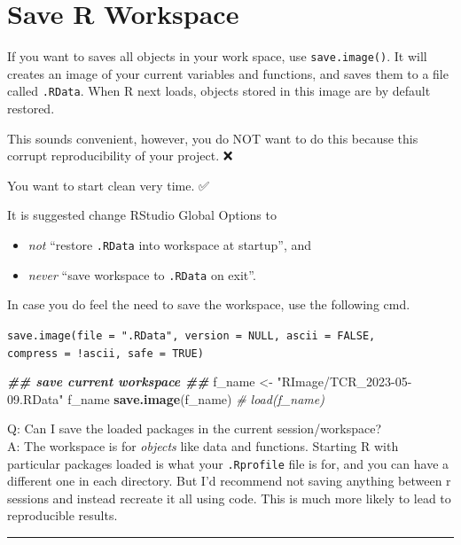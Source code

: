 \documentclass[
]{book}
\newenvironment{Shaded}{\begin{snugshade}}{\end{snugshade}}
\newcommand{\CommentTok}[1]{\textcolor[rgb]{0.56,0.35,0.01}{\textit{#1}}}
\newcommand{\DocumentationTok}[1]{\textcolor[rgb]{0.56,0.35,0.01}{\textbf{\textit{#1}}}}
\newcommand{\FunctionTok}[1]{\textcolor[rgb]{0.13,0.29,0.53}{\textbf{#1}}}
\newcommand{\NormalTok}[1]{#1}
\newcommand{\OtherTok}[1]{\textcolor[rgb]{0.56,0.35,0.01}{#1}}
\newcommand{\StringTok}[1]{\textcolor[rgb]{0.31,0.60,0.02}{#1}}
\providecommand{\tightlist}{%
  \setlength{\itemsep}{0pt}\setlength{\parskip}{0pt}}
\begin{document}
\section{Save R Workspace}\label{save-r-workspace}

If you want to saves {all objects} in your work space, use \texttt{save.image()}. It will creates an image of your current variables and functions, and saves them to a file called \texttt{.RData}. When R next loads, objects stored in this image are by default restored.

This sounds convenient, however, you do NOT want to do this because this corrupt reproducibility of your project. ❌

You want to start clean very time. ✅

It is suggested change RStudio Global Options to

\begin{itemize}
\tightlist
\item
  \emph{not} ``restore \texttt{.RData} into workspace at startup'', and
\item
  \emph{never} ``save workspace to \texttt{.RData} on exit''.
\end{itemize}

In case you do feel the need to save the workspace, use the following cmd.

\texttt{save.image(file\ =\ ".RData",\ version\ =\ NULL,\ ascii\ =\ FALSE,\ \ \ \ \ \ \ \ \ \ \ \ compress\ =\ !ascii,\ safe\ =\ TRUE)}

\begin{Shaded}
\begin{Highlighting}[]
\DocumentationTok{\#\# save current workspace \#\#}
\NormalTok{f\_name }\OtherTok{\textless{}{-}} \StringTok{"RImage/TCR\_2023{-}05{-}09.RData"}
\NormalTok{f\_name}
\FunctionTok{save.image}\NormalTok{(f\_name)}
\CommentTok{\# load(f\_name)}
\end{Highlighting}
\end{Shaded}

Q: Can I save the loaded packages in the current session/workspace?\\
A: The workspace is for \emph{objects} like data and functions. Starting R with particular packages loaded is what your \texttt{.Rprofile} file is for, and you can have a different one in each directory. But I'd recommend not saving anything between r sessions and instead recreate it all using code. This is much more likely to lead to reproducible results.

\begin{center}\rule{0.5\linewidth}{0.5pt}\end{center}
\end{document}
